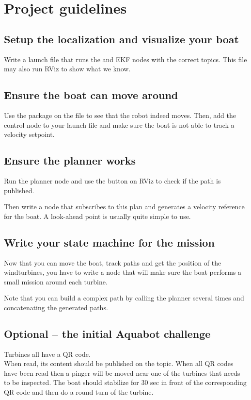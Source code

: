 \documentclass{ecnreport}
\begin{document}
\section{Project guidelines}


\subsection{Setup the localization and visualize your boat}

Write a launch file that runs the  and EKF nodes with the correct topics. This file may also run RViz to show what we know.

\subsection{Ensure the boat can move around}

Use the  package on the  file to see that the robot indeed moves.
Then, add the control node to your launch file and make sure the boat is not able to track a velocity setpoint.

\subsection{Ensure the planner works}

Run the planner node and use the  button on RViz to check if the path is published.

Then write a node that subscribes to this plan and generates a velocity reference for the boat. A look-ahead point is usually quite simple to use.

\subsection{Write your state machine for the mission}

Now that you can move the boat, track paths and get the position of the windturbines, you have to write a node that will make sure the boat performs a small mission around each turbine.

Note that you can build a complex path by calling the planner several times and concatenating the generated paths.

\subsection{Optional -- the initial Aquabot challenge}

  Turbines all have a QR code. \\
  When read, its content should be published on the {\footnotesize {}} topic. When all QR codes have been read then a pinger will be moved near one of the turbines that needs to be inspected. The boat should stabilize for 30 sec in
front of the corresponding QR code and then do a round turn of the turbine.


  
\end{document}
